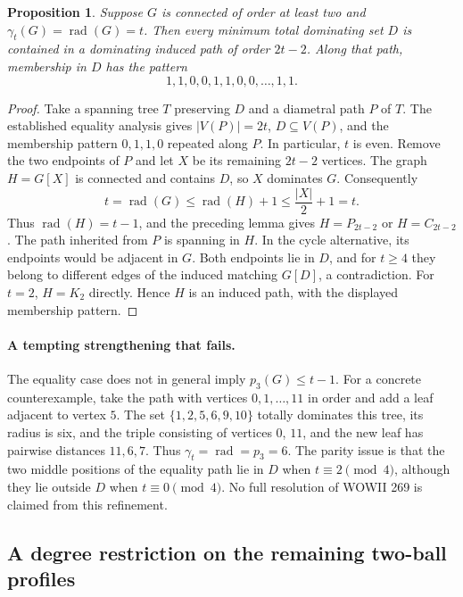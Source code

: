\documentclass[11pt,a4paper]{article}
\newtheorem{proposition}[theorem]{Proposition}
\theoremstyle{remark}
\begin{document}
\begin{proposition}\label{r9:prop-equality-induced-path}
Suppose $G$ is connected of order at least two and
$\gamma_t(G)=\operatorname{rad}(G)=t$. Then every minimum total
dominating set $D$ is contained in a dominating induced path of
order $2t-2$. Along that path, membership in $D$ has the pattern
\[
 1,1,0,0,1,1,0,0,\ldots,1,1.
\]
\end{proposition}
\begin{proof}
Take a spanning tree $T$ preserving $D$ and a diametral path $P$
of $T$. The established equality analysis gives $|V(P)|=2t$,
$D\subseteq V(P)$, and the membership pattern $0,1,1,0$ repeated
along $P$. In particular, $t$ is even. Remove the two endpoints of
$P$ and let $X$ be its remaining $2t-2$ vertices. The graph $H=G[X]$
is connected and contains $D$, so $X$ dominates $G$. Consequently
\[
 t=\operatorname{rad}(G)\le\operatorname{rad}(H)+1
 \le\frac{|X|}{2}+1=t.
\]
Thus $\operatorname{rad}(H)=t-1$, and the preceding lemma gives
$H=P_{2t-2}$ or $H=C_{2t-2}$. The path inherited from $P$ is
spanning in $H$. In the cycle alternative, its endpoints would be
adjacent in $G$. Both endpoints lie in $D$, and for $t\ge4$ they
belong to different edges of the induced matching $G[D]$, a
contradiction. For $t=2$, $H=K_2$ directly. Hence $H$ is an induced
path, with the displayed membership pattern.
\end{proof}

\paragraph{A tempting strengthening that fails.}
The equality case does not in general imply $p_3(G)\le t-1$.
For a concrete counterexample, take the path with vertices
$0,1,\ldots,11$ in order and add a leaf adjacent to vertex $5$.
The set $\{1,2,5,6,9,10\}$ totally dominates this tree, its radius
is six, and the triple consisting of vertices $0$, $11$, and the
new leaf has pairwise distances $11,6,7$. Thus
$\gamma_t=\operatorname{rad}=p_3=6$.
The parity issue is that the two middle positions of the equality
path lie in $D$ when $t\equiv2\pmod4$, although they lie outside
$D$ when $t\equiv0\pmod4$. No full resolution of WOWII 269 is
claimed from this refinement.

\subsection{A degree restriction on the remaining two-ball profiles}
\label{r9:subsec-two-ball-degree}
\end{document}
